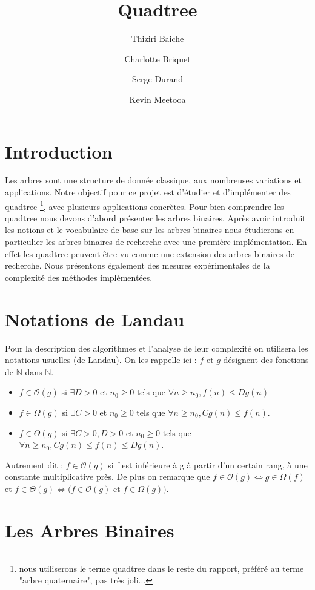 \documentclass{report}
\title{Quadtree}
\author{Thiziri Baiche \and Charlotte Briquet \and Serge Durand \and Kevin Meetooa}
\begin{document}
\maketitle
\tableofcontents
\section{Introduction}
Les arbres sont une structure de donnée classique, aux nombreuses variations et applications. Notre objectif pour ce projet est d'étudier et d'implémenter des quadtree \footnote{nous utiliserons le terme quadtree dans le reste du rapport, préféré au terme "arbre quaternaire", pas très joli...}, avec plusieurs applications concrètes. Pour bien comprendre les quadtree nous devons d'abord présenter les arbres binaires. Après avoir introduit les notions et le vocabulaire de base sur les arbres binaires nous étudierons en particulier les arbres binaires de recherche avec une première implémentation. En effet les quadtree peuvent être vu comme une extension des arbres binaires de recherche. Nous présentons également des mesures expérimentales de la complexité des méthodes implémentées.
\section{Notations de Landau}
Pour la description des algorithmes et l'analyse de leur complexité on utilisera les notations usuelles (de Landau). On les rappelle ici :
$f$ et $g$ désignent des fonctions de $\mathbb{N}$ dans $\mathbb{N}$.
\begin{itemize}
\item $f \in \mathcal{O}(g)$ si $\exists D > 0$ et $n_0 \geq 0$ tels que $\forall n \geq n_0, f(n) \leq Dg(n)$
\item $f \in \Omega(g)$ si $\exists C >0$ et $n_0 \geq 0$ tels que $\forall n \geq n_0, Cg(n) \leq f(n)$.
\item $f \in \Theta(g)$ si $\exists C>0, D>0$ et $n_0 \geq 0$ tels que $\forall n \geq n_0, Cg(n) \leq f(n) \leq Dg(n)$.
\end{itemize}

Autrement dit : $f \in \mathcal{O}(g)$ si f est inférieure à g à partir d'un certain rang, à une constante multiplicative près. 
De plus on remarque que $f \in \mathcal{O}(g) \iff g \in \Omega(f)$ et $f \in \Theta(g) \iff (f \in \mathcal{O}(g)$ et $f \in \Omega(g))$.
\section{Les Arbres Binaires}
\end{document}
